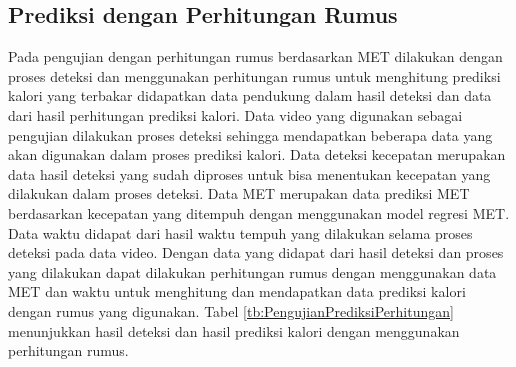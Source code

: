 \subsection{Prediksi dengan Perhitungan Rumus}
\label{subsec:PengujianPrediksiPerhitungan}

Pada pengujian dengan perhitungan rumus berdasarkan MET dilakukan dengan proses deteksi dan menggunakan perhitungan rumus untuk menghitung prediksi kalori yang terbakar didapatkan data pendukung dalam hasil deteksi dan data dari hasil perhitungan prediksi kalori. Data video yang digunakan sebagai pengujian dilakukan proses deteksi sehingga mendapatkan beberapa data yang akan digunakan dalam proses prediksi kalori. Data deteksi kecepatan merupakan data hasil deteksi yang sudah diproses untuk bisa menentukan kecepatan yang dilakukan dalam proses deteksi. Data MET merupakan data prediksi MET berdasarkan kecepatan yang ditempuh dengan menggunakan model regresi MET. Data waktu didapat dari hasil waktu tempuh yang dilakukan selama proses deteksi pada data video. Dengan data yang didapat dari hasil deteksi dan proses yang dilakukan dapat dilakukan perhitungan rumus dengan menggunakan data MET dan waktu untuk menghitung dan mendapatkan data prediksi kalori dengan rumus yang digunakan. Tabel \ref{tb:PengujianPrediksiPerhitungan} menunjukkan hasil deteksi dan hasil prediksi kalori dengan menggunakan perhitungan rumus.

